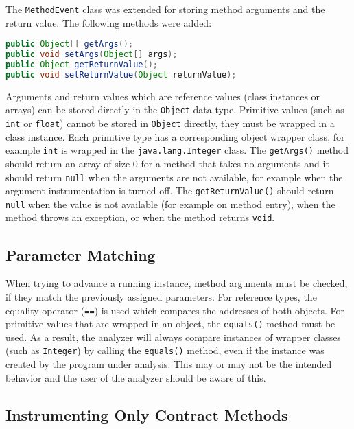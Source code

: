 The \texttt{MethodEvent} class was extended for storing method arguments and the
return value. The following methods were added:

\begin{lstlisting}[language=java]
public Object[] getArgs();
public void setArgs(Object[] args);
public Object getReturnValue();
public void setReturnValue(Object returnValue);
\end{lstlisting}

Arguments and return values which are reference values (class instances or
arrays) can be stored directly in the \texttt{Object} data type. Primitive
values (such as \texttt{int} or \texttt{float}) cannot be stored in
\texttt{Object} directly, they must be wrapped in a class instance. Each
primitive type has a corresponding object wrapper class, for example
\texttt{int} is wrapped in the \texttt{java.lang.Integer} class. The
\texttt{getArgs()} method should return an array of size 0 for a method that
takes no arguments and it should return \texttt{null} when the arguments are not
available, for example when the argument instrumentation is turned off. The
\texttt{getReturnValue()} should return \texttt{null} when the value is not
available (for example on method entry), when the method throws an exception, or
when the method returns \texttt{void}.

\subsection{Parameter Matching}
When trying to advance a running instance, method arguments must be checked, if
they match the previously assigned parameters. For reference types, the equality
operator (\texttt{==}) is used which compares the addresses of both objects. For
primitive values that are wrapped in an object, the \texttt{equals()} method
must be used. As a result, the analyzer will always compare instances of wrapper
classes (such as \texttt{Integer}) by calling the \texttt{equals()} method, even
if the instance was created by the program under analysis. This may or may not
be the intended behavior and the user of the analyzer should be aware of this.

\subsection{Instrumenting Only Contract Methods}

